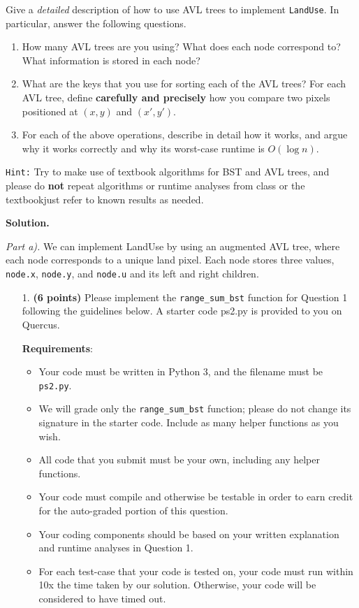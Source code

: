 \documentclass{assignment-263}
\begin{document}
\begin{enumerate}
		Give a \emph{detailed} description of how to use AVL trees to
		implement \texttt{LandUse}. In particular, answer the following
		questions.
		\begin{enumerate}
		\item	How many AVL trees are you using? What does each node
			correspond to? What information is stored in each node?
		\item	What are the keys that you use for sorting each of the AVL
			trees? For each AVL tree, define \textbf{carefully and
			precisely} how you compare two pixels positioned at $(x, y)$ and
			$(x', y')$.
		\item	For each of the above operations, describe in detail how
				it works, and argue why it works correctly and why its
				worst-case runtime is $O(\log n)$.
		\end{enumerate}
		\texttt{Hint:} Try to make use of textbook algorithms for BST and AVL
		trees, and please do \textbf{not} repeat algorithms or runtime
		analyses from class or the textbook\textemdash just refer to known results
		as needed. \hfill \break
\end{enumerate}

\textbf{Solution.}

\textit{Part a).} We can implement LandUse by using an augmented AVL tree, where each node corresponds to a unique land pixel. Each node stores three values, \verb|node.x|, \verb|node.y|, and \verb|node.u| and its left and right children. 

\program

\begin{enumerate}
\item[1.] \textbf{(6 points)}
Please implement the \verb|range_sum_bst| function for Question 1 following the guidelines below. 
A starter code ps2.py is provided to you on Quercus. 

\textbf{Requirements}:
\begin{itemize}
\item Your code must be written in Python 3, and the filename must be \verb|ps2.py|.
\item We will grade only the \verb|range_sum_bst| function;
      please do not change its signature in the starter code.
      Include as many helper functions as you wish.
\item All code that you submit must be your own, including any helper functions.
\item Your code must compile and otherwise be testable in order to earn credit
      for the auto-graded portion of this question.
\item Your coding components should be based on your written explanation and runtime analyses in Question 1.
\item For each test-case that your code is tested on, your code must run within
10x the time taken by our solution. Otherwise, your code will be considered to have timed out.
\end{itemize}


\end{enumerate}  
\end{document}
